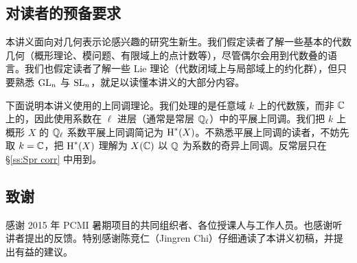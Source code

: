 \subsection{对读者的预备要求} 本讲义面向对几何表示论感兴趣的研究生新生。我们假定读者了解一些基本的代数几何（概形理论、模问题、有限域上的点计数等），尽管偶尔会用到代数叠的语言。我们也假定读者了解一些 Lie 理论（代数闭域上与局部域上的约化群），但只要熟悉 $\textup{GL}_{n}$ 与 $\textup{SL}_{n}$，就足以读懂本讲义的大部分内容。

下面说明本讲义使用的上同调理论。我们处理的是任意域 $k$ 上的代数簇，而非 $\mathbb{C}$ 上的，因此使用系数在 $\ell$ 进层（通常是常层 $\mathbb{Q}_{\ell}$）中的平展上同调。我们把 $k$ 上概形 $X$ 的 $\mathbb{Q}_{\ell}$ 系数平展上同调简记为 $\textup{H}^{*}({X})$。不熟悉平展上同调的读者，不妨先取 $k=\mathbb{C}$，把 $\textup{H}^{*}({X})$ 理解为 $X(\mathbb{C})$ 以 $\mathbb{Q}$ 为系数的奇异上同调。反常层只在 \S\ref{ss:Spr corr} 中用到。

\subsection*{致谢} 感谢 2015 年 PCMI 暑期项目的共同组织者、各位授课人与工作人员。也感谢听讲者提出的反馈。特别感谢陈竞仁（Jingren Chi）仔细通读了本讲义初稿，并提出有益的建议。
